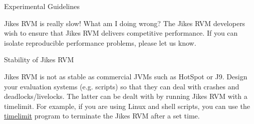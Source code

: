 \begin{chapter}{Experimental Guidelines}
\begin{section}{Jikes RVM is really slow! What am I doing wrong?}
The Jikes RVM developers wish to ensure that Jikes RVM delivers competitive performance. If you can isolate reproducible performance problems, please let us know.

\end{section}

\begin{section}{Stability of Jikes RVM}

Jikes RVM is not as stable as commercial JVMs such as HotSpot or J9. Design your evaluation systems (e.g. scripts) so that they can deal with crashes and deadlocks/livelocks. The latter can be dealt with by running Jikes RVM with a timelimit. For example, if you are using Linux and shell scripts, you can use the \href{http://devel.ringlet.net/sysutils/timelimit/}{timelimit} program to terminate the Jikes RVM after a set time.

\end{section}

\end{chapter}
